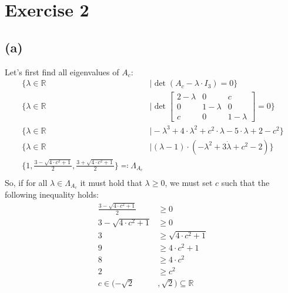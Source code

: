\documentclass[12pt]{article}
\begin{document}
\section*{Exercise 2}
\subsection*{(a)}
Let's first find all eigenvalues of $A_c$:
\begin{align*}
	\{ \lambda \in \mathbb{R} &\mid \det\left( A_c - \lambda \cdot I_3 \right) = 0\} \\
	\{ \lambda \in \mathbb{R} &\mid \det\left[ \begin{array}{ccc} 2 - \lambda & 0 & c \\ 0 & 1 - \lambda & 0 \\ c & 0 & 1 - \lambda \end{array} \right] = 0\} \\
	\{ \lambda \in \mathbb{R} &\mid -\lambda^3 + 4 \cdot \lambda^2 + c^2 \cdot \lambda - 5 \cdot \lambda + 2 -c^2\} \\
	\{ \lambda \in \mathbb{R} &\mid (\lambda - 1) \cdot (-\lambda^2 + 3 \dot \lambda + c^2 - 2)\} \\
	\{ 1, \frac{3 - \sqrt{4 \cdot c^2 + 1}}{2}, \frac{3 + \sqrt{4 \cdot c^2 + 1}}{2}\} \eqqcolon \Lambda_{A_c}\\
\end{align*}
So, if for all $\lambda \in \Lambda_{A_c}$ it must hold that $\lambda \geq 0$, we must set $c$ such that the following inequality holds:
\begin{align*}
	\frac{3 - \sqrt{4 \cdot c^2 + 1}}{2} &\geq 0 \\
	3 - \sqrt{4 \cdot c^2 + 1} &\geq 0 \\
	3 &\geq \sqrt{4 \cdot c^2 + 1} \\
	9 &\geq 4 \cdot c^2 + 1 \\
	8 &\geq 4 \cdot c^2 \\
	2 &\geq c^2 \\
	c \in (-\sqrt{2}&, \sqrt{2}) \subseteq \mathbb{R}
\end{align*}
\end{document}
